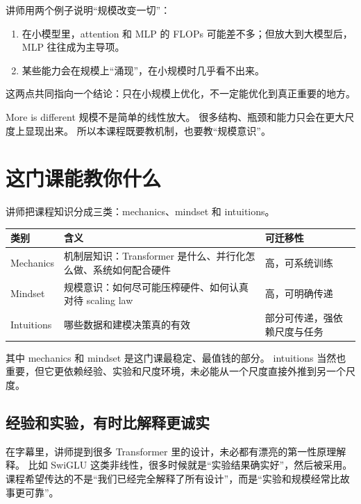 \documentclass[a4paper]{article}
\begin{document}
讲师用两个例子说明“规模改变一切”：
\begin{enumerate}
    \item 在小模型里，attention 和 MLP 的 FLOPs 可能差不多；但放大到大模型后，MLP 往往成为主导项。
    \item 某些能力会在规模上“涌现”，在小规模时几乎看不出来。
\end{enumerate}

这两点共同指向一个结论：只在小规模上优化，不一定能优化到真正重要的地方。

\begin{warningbox}{More is different}
规模不是简单的线性放大。
很多结构、瓶颈和能力只会在更大尺度上显现出来。
所以本课程既要教机制，也要教“规模意识”。
\end{warningbox}

\section{这门课能教你什么}

讲师把课程知识分成三类：mechanics、mindset 和 intuitions。

\begin{table}[H]
\centering
\begin{tabular}{p{2.6cm}p{4.8cm}p{6.2cm}}
\toprule
\textbf{类别} & \textbf{含义} & \textbf{可迁移性} \\
\midrule
Mechanics & 机制层知识：Transformer 是什么、并行化怎么做、系统如何配合硬件 & 高，可系统训练 \\
Mindset & 规模意识：如何尽可能压榨硬件、如何认真对待 scaling law & 高，可明确传递 \\
Intuitions & 哪些数据和建模决策真的有效 & 部分可传递，强依赖尺度与任务 \\
\bottomrule
\end{tabular}
\end{table}

其中 mechanics 和 mindset 是这门课最稳定、最值钱的部分。
intuitions 当然也重要，但它更依赖经验、实验和尺度环境，未必能从一个尺度直接外推到另一个尺度。

\subsection{经验和实验，有时比解释更诚实}

在字幕里，讲师提到很多 Transformer 里的设计，未必都有漂亮的第一性原理解释。
比如 SwiGLU 这类非线性，很多时候就是“实验结果确实好”，然后被采用。
课程希望传达的不是“我们已经完全解释了所有设计”，而是“实验和规模经常比故事更可靠”。
\end{document}
